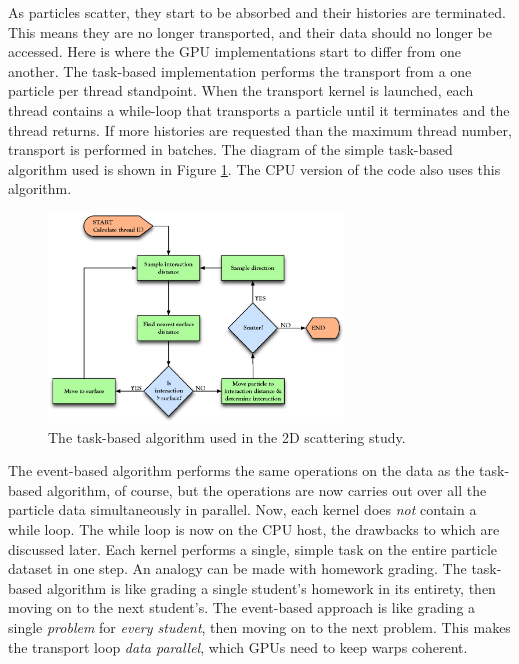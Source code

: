 As particles scatter, they start to be absorbed and their histories are terminated.  This means they are no longer transported, and their data should no longer be accessed.  Here is where the GPU implementations start to differ from one another.  The task-based implementation performs the transport from a one particle per thread standpoint.  When the transport kernel is launched, each thread contains a while-loop that transports a particle until it terminates and the thread returns.  If more histories are requested than the maximum thread number, transport is performed in batches.  The diagram of the simple task-based algorithm used is shown in Figure \ref{prelim_alg_task}.  The CPU version of the code also uses this algorithm.

\begin{figure}[h!] 
  \centering
    \includegraphics[width=0.7\textwidth]{graphics/prelim_alg_task.eps}
     \caption{The task-based algorithm used in the 2D scattering study. \label{prelim_alg_task} }
\end{figure}

The event-based algorithm performs the same operations on the data as the task-based algorithm, of course, but the operations are now carries out over all the particle data simultaneously in parallel.  Now, each kernel does \emph{not} contain a while loop.  The while loop is now on the CPU host, the drawbacks to which are discussed later.  Each kernel performs a single, simple task on the entire particle dataset in one step.  An analogy can be made with homework grading.  The task-based algorithm is like grading a single student's homework in its entirety, then moving on to the next student's.  The event-based approach is like grading a single \emph{problem} for \emph{every student}, then moving on to the next problem.  This makes the transport loop \emph{data parallel}, which GPUs need to keep warps coherent. 

